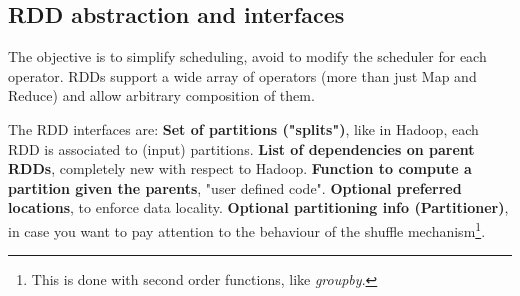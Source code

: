 	\subsection{RDD abstraction and interfaces}
		\par
		The objective is to simplify scheduling, avoid to modify the scheduler for each operator. RDDs support a wide array of operators (more than just Map and Reduce) and allow arbitrary composition of them.
		\newline
		\par\noindent
		The RDD interfaces are:
		\newline
		\textbf{Set of partitions ("splits")}, like in Hadoop, each RDD is associated to (input) partitions.
		\newline
		\textbf{List of dependencies on parent RDDs}, completely new with respect to Hadoop.
		\newline
		\textbf{Function to compute a partition given the parents}, "user defined code".
		\newline
		\textbf{Optional preferred locations}, to enforce data locality.
		\newline
		\textbf{Optional partitioning info (Partitioner)}, in case you want to pay attention to the behaviour of the shuffle mechanism\footnote{This is done with second order functions, like \textit{groupby}.}.
	\pagebreak
